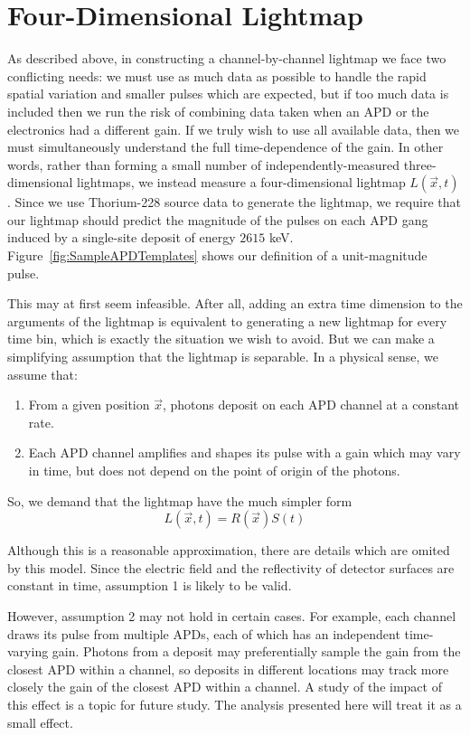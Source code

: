 \section{Four-Dimensional Lightmap}\label{sec:FourDimLightmapParent}

As described above, in constructing a channel-by-channel lightmap we face two conflicting needs: we must use as much data as possible to handle the rapid spatial variation and smaller pulses which are expected, but if too much data is included then we run the risk of combining data taken when an APD or the electronics had a different gain.  If we truly wish to use all available data, then we must simultaneously understand the full time-dependence of the gain.  In other words, rather than forming a small number of independently-measured three-dimensional lightmaps, we instead measure a four-dimensional lightmap $L(\vec{x},t)$.  Since we use Thorium-228 source data to generate the lightmap, we require that our lightmap should predict the magnitude of the pulses on each APD gang induced by a single-site deposit of energy $2615$ keV.  Figure~\ref{fig:SampleAPDTemplates} shows our definition of a unit-magnitude pulse.

This may at first seem infeasible.  After all, adding an extra time dimension to the arguments of the lightmap is equivalent to generating a new lightmap for every time bin, which is exactly the situation we wish to avoid.  But we can make a simplifying assumption that the lightmap is separable.  In a physical sense, we assume that:
\begin{enumerate}
\item From a given position $\vec{x}$, photons deposit on each APD channel at a constant rate.
\item Each APD channel amplifies and shapes its pulse with a gain which may vary in time, but does not depend on the point of origin of the photons.
\end{enumerate}
So, we demand that the lightmap have the much simpler form
\begin{equation} \label{eqn:SeparableLightmap}
L(\vec{x},t) = R(\vec{x})S(t)
\end{equation}

Although this is a reasonable approximation, there are details which are omited by this model.  Since the electric field and the reflectivity of detector surfaces are constant in time, assumption 1 is likely to be valid.

However, assumption 2 may not hold in certain cases. For example, each channel draws its pulse from multiple APDs, each of which has an independent time-varying gain.  Photons from a deposit may preferentially sample the gain from the closest APD within a channel, so deposits in different locations may track more closely the gain of the closest APD within a channel.  A study of the impact of this effect is a topic for future study. The analysis presented here will treat it as a small effect.

